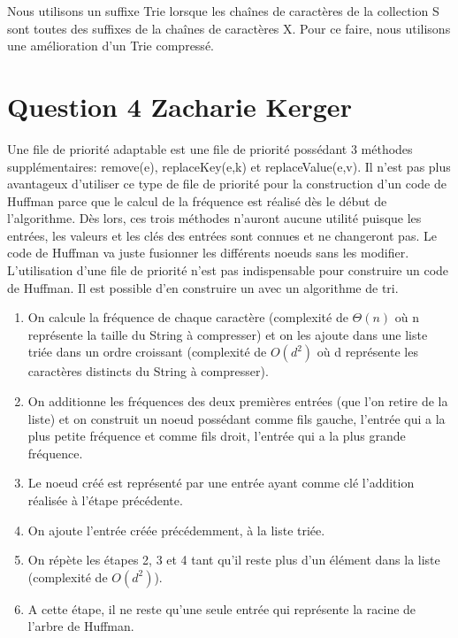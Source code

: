 \documentclass[10pt,a4paper]{article}
\begin{document}
Nous utilisons un suffixe Trie lorsque les chaînes de caractères de la collection S sont toutes des suffixes de la chaînes de caractères X. Pour ce faire, nous utilisons une amélioration d’un Trie compressé.\\

\section*{Question 4 Zacharie Kerger}

Une file de priorité adaptable est une file de priorité possédant 3 méthodes supplémentaires: remove(e), replaceKey(e,k) et replaceValue(e,v). Il n'est pas plus avantageux d'utiliser ce type de file de priorité pour la construction d'un code de Huffman parce que le calcul de la fréquence est réalisé dès le début de l'algorithme. Dès lors, ces trois méthodes n'auront aucune utilité puisque les entrées, les valeurs et les clés des entrées sont connues et ne changeront pas. Le code de Huffman va juste fusionner les différents noeuds sans les modifier.\\

L’utilisation d’une file de priorité n’est pas indispensable pour construire un code de Huffman. Il est possible d'en construire un avec un algorithme de tri. 

\begin{enumerate}
\item On calcule la fréquence de chaque caractère (complexité de $\Theta(n)$ où n représente la taille du String à compresser) et on les ajoute dans une liste triée dans un ordre croissant (complexité de $O(d^{2})$ où d représente les caractères distincts du String à compresser).
\item On additionne les fréquences des deux premières entrées (que l'on retire de la liste) et on construit un noeud possédant comme fils gauche, l'entrée qui a la plus petite fréquence et comme fils droit, l'entrée qui a la plus grande fréquence.
\item Le noeud créé est représenté par une entrée ayant comme clé l'addition réalisée à l'étape précédente. 
\item On ajoute l'entrée créée précédemment, à la liste triée.
\item On répète les étapes 2, 3 et 4 tant qu'il reste plus d'un élément dans la liste (complexité de $O(d^{2})$). 
\item A cette étape, il ne reste qu'une seule entrée qui représente la racine de l'arbre de Huffman.
\end{enumerate}
\end{document}
